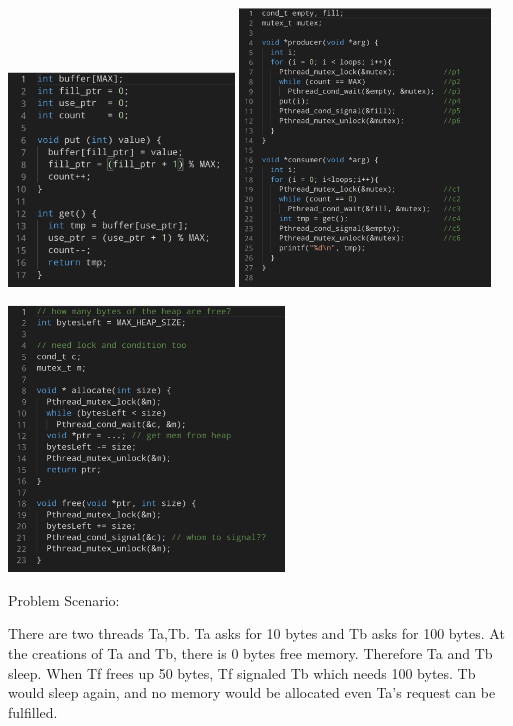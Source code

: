     \includegraphics[width=0.45\textwidth]{chapters/Cucurrency/Cucurrency/revised_get_and_put.png}
    \includegraphics[width=0.50\textwidth]{chapters/Cucurrency/Cucurrency/revised_producer_consumer.png}


    \includegraphics[width=0.55\textwidth]{chapters/Cucurrency/Cucurrency/covering_conditions.png}

    Problem Scenario:

    There are two threads Ta,Tb. Ta asks for 10 bytes and Tb asks for 100 bytes. At the creations of Ta and 
    Tb, there is 0 bytes free memory. Therefore Ta and Tb sleep. When Tf frees up 50 bytes, Tf signaled 
    Tb which needs 100 bytes. Tb would sleep again, and no memory would be allocated even Ta's request 
    can be fulfilled.\\

